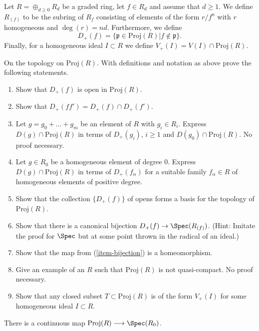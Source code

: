 \begin{definition}
\label{definition-Dplus-Vplus}
Let $R = \oplus_{d \geq 0} R_d$ be a graded ring, let $f\in R_d$ and
assume that $d \geq 1$. We define {\it $R_{(f)}$} to be the subring of
$R_f$ consisting of elements of the form $r/f^n$ with $r$ homogeneous and
$\deg(r) = nd$. Furthermore, we define
$$
D_{+}(f) = \{ {\mathfrak p} \in \text{Proj}(R) | f \not\in {\mathfrak p} \}.
$$
Finally, for a homogeneous ideal $I \subset R$ we define
$V_{+}(I) = V(I) \cap \text{Proj}(R)$.
\end{definition}

\begin{exercise}
\label{exercise-topology-proj}
On the topology on $\text{Proj}(R)$. With definitions and notation as
above prove the following statements.
\begin{enumerate}
\item Show that $D_{+}(f)$ is open in $\text{Proj}(R)$.
\item Show that $D_{+}(ff') = D_{+}(f) \cap D_{+}(f')$.
\item Let $g = g_0 + \ldots + g_m$ be an element
of $R$ with $g_i \in R_i$. Express $D(g) \cap \text{Proj}(R)$
in terms of $D_{+}(g_i)$, $i \geq 1$ and $D(g_0) \cap \text{Proj}(R)$.
No proof necessary.
\item Let $g\in R_0$ be a homogeneous element of degree $0$.
Express $D(g) \cap \text{Proj}(R)$ in terms of $D_{+}(f_\alpha)$
for a suitable family $f_\alpha \in R$ of homogeneous elements of
positive degree.
\item Show that the collection $\{D_{+}(f)\}$ of opens forms a
basis for the topology of $\text{Proj}(R)$.
\item
\label{item-bijection}
Show that there is a canonical bijection $D_{+}(f) \to \Spec(R_{(f)})$.
(Hint: Imitate the proof for $\Spec$ but at some point thrown in the
radical of an ideal.)
\item Show that the map from (\ref{item-bijection}) is a homeomorphism.
\item Give an example of an $R$ such that $\text{Proj}(R)$ is not
quasi-compact. No proof necessary.
\item Show that any closed subset $T \subset \text{Proj}(R)$ is of
the form $V_{+}(I)$ for some homogeneous ideal $I \subset R$.
\end{enumerate}
\end{exercise}

\begin{remark}
\label{remark-continuous-proj-spec}
There is a continuous map $ \text{Proj}(R) \longrightarrow \Spec(R_0) $.
\end{remark}

